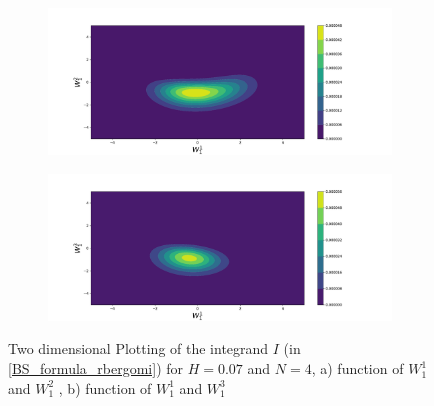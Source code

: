 \documentclass[11pt]{article}
\begin{document}
\begin{figure}[h!]
	\centering
	\begin{subfigure}{.4\textwidth}
		\centering
		\includegraphics[width=1\linewidth]{./figures/integrand_plotting_rBergomi/2D_plots/N_4/H_007/Bergomi_integrand_contours_K_1_H_007_W1_1_2_N_4}
		\caption{}
		\label{fig:sub3}
	\end{subfigure}%
	\begin{subfigure}{.4\textwidth}
		\centering
		\includegraphics[width=1\linewidth]{./figures/integrand_plotting_rBergomi/2D_plots/N_4/H_007/Bergomi_integrand_contours_K_1_H_007_W1_1_3_N_4}
		\caption{}
		\label{fig:sub4}
	\end{subfigure}
	\caption{Two dimensional Plotting of the integrand $I$ (in \eqref{BS_formula_rbergomi})  for $H=0.07$ and $N=4$, a)  function of $W_1^1$ and $W_1^2$ , b) function of $W_1^1$ and $W_1^3$ }
	\label{fig:Integrand_H_007_N_4_2D_W_1_2_3}
\end{figure}
\end{document}

